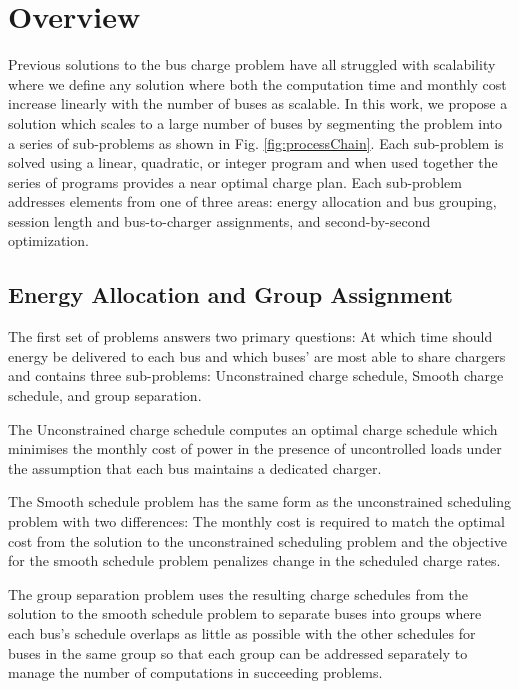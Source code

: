 \section{Overview}
Previous solutions to the bus charge problem have all struggled with scalability where we define any solution where both the computation time and monthly cost increase linearly with the number of buses as scalable. In this work, we propose a solution which scales to a large number of buses by segmenting the problem into a series of sub-problems as shown in Fig. \ref{fig:processChain}. Each sub-problem is solved using a linear, quadratic, or integer program and when used together the series of programs provides a near optimal charge plan. Each sub-problem addresses elements from one of three areas: energy allocation and bus grouping, session length and bus-to-charger assignments, and second-by-second optimization.
\subsection{Energy Allocation and Group Assignment}
\par The first set of problems answers two primary questions: At which time should energy be delivered to each bus and which buses' are most able to share chargers and contains three sub-problems: Unconstrained charge schedule, Smooth charge schedule, and group separation. 
\par The Unconstrained charge schedule computes an optimal charge schedule which minimises the monthly cost of power in the presence of uncontrolled loads under the assumption that each bus maintains a dedicated charger. 
\par The Smooth schedule problem has the same form as the unconstrained scheduling problem with two differences: The monthly cost is required to match the optimal cost from the solution to the unconstrained scheduling problem and the objective for the smooth schedule problem penalizes change in the scheduled charge rates.
\par The group separation problem uses the resulting charge schedules from the solution to the smooth schedule problem to separate buses into groups where each bus's schedule overlaps as little as possible with the other schedules for buses in the same group so that each group can be addressed separately to manage the number of computations in succeeding problems.
